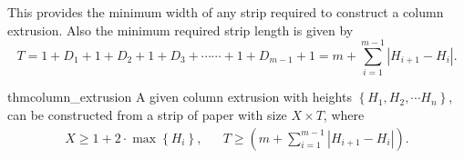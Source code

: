 This provides the minimum width of any strip required to construct a column extrusion.
Also the minimum required strip length is given by
$$ T = 1 + D_1  +  1 + D_2  +  1 + D_3  +\cdots\cdots +  1 + D_{m-1}  +  1 = m + \sum^{m-1}_{i=1} \left| H_{i+1}-H_i\right|. $$

\begin{restatable}{thm}{column_extrusion}
\label{thm:column_extrusion}
A given column extrusion with heights $\left\{ H_1, H_2,\cdots H_n \right\}$, can be constructed from a strip of paper with size
$X\times T$, where
\begin{align*}
X\ge 1 + 2\cdot\max\left\{ H_i\right\}, && T \ge \left( m + \sum\limits^{m-1}_{i=1} \left| H_{i+1}-H_i\right|\right).
\end{align*}
\end{restatable}
